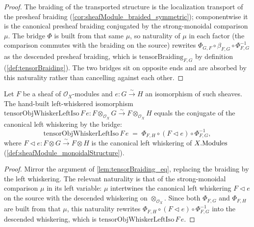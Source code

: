 \begin{proof}
  \leanok
  The braiding of the transported structure is the localization transport of the
  presheaf braiding (\cref{cor:sheafModule_braided_symmetric}); componentwise it is
  the canonical presheaf braiding conjugated by the strong-monoidal comparison
  \(\mu\). The bridge \(\Phi\) is built from that same \(\mu\), so naturality of
  \(\mu\) in each factor (the comparison commutes with the braiding on the source)
  rewrites \(\Phi_{G,F} \circ \beta_{F,G} \circ \Phi_{F,G}^{-1}\) as the descended
  presheaf braiding, which is \(\mathrm{tensorBraiding}_{F,G}\) by definition
  (\cref{def:tensorBraiding}). The two bridges sit on opposite ends and are
  absorbed by this naturality rather than cancelling against each other.
\end{proof}

\begin{lemma}

  \label{lem:tensorObjWhiskerLeftIso_eq}
  Let \(F\) be a sheaf of \(\mathcal{O}_X\)-modules and \(e : G \xrightarrow{\sim}
  H\) an isomorphism of such sheaves. The hand-built left-whiskered isomorphism
  \(\mathrm{tensorObjWhiskerLeftIso}\,F\,e : F \otimes_{\mathcal{O}_X} G
  \xrightarrow{\sim} F \otimes_{\mathcal{O}_X} H\) equals the conjugate of the
  canonical left whiskering by the bridge:
  \[
    \mathrm{tensorObjWhiskerLeftIso}\,F\,e
      \;=\; \Phi_{F,H} \circ (F \lhd e) \circ \Phi_{F,G}^{-1},
  \]
  where \(F \lhd e : F \otimes G \xrightarrow{\sim} F \otimes H\) is the canonical
  left whiskering of \(X.\mathrm{Modules}\) (\cref{def:sheafModule_monoidalStructure}).
\end{lemma}

\begin{proof}
  \leanok
  Mirror the argument of \cref{lem:tensorBraiding_eq}, replacing the braiding by the
  left whiskering. The relevant naturality is that of the strong-monoidal
  comparison \(\mu\) in its left variable: \(\mu\) intertwines the canonical left
  whiskering \(F \lhd e\) on the source with the descended whiskering on
  \(\otimes_{\mathcal{O}_X}\). Since both \(\Phi_{F,G}\) and \(\Phi_{F,H}\) are
  built from that \(\mu\), this naturality rewrites
  \(\Phi_{F,H} \circ (F \lhd e) \circ \Phi_{F,G}^{-1}\) into the descended
  whiskering, which is \(\mathrm{tensorObjWhiskerLeftIso}\,F\,e\).
\end{proof}


